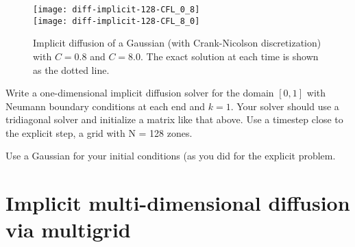 \begin{figure}[t]
\centering
\texttt{[image: diff-implicit-128-CFL\_0\_8]}\\
\texttt{[image: diff-implicit-128-CFL\_8\_0]}
\caption[Implicit diffusion of a Gaussian]{\label{fig:diffuse}
  Implicit diffusion of a Gaussian (with Crank-Nicolson
  discretization) with $C = 0.8$ and $C = 8.0$.  The exact solution at
  each time is shown as the dotted
  line. \\ }
\end{figure}

\begin{exercise}
{Write a one-dimensional implicit diffusion solver for the
  domain $[0,1]$ with Neumann boundary conditions at each end and $k = 1$.
  Your solver should use a tridiagonal solver and initialize a matrix like
  that above.  Use a timestep close to the explicit step, a grid with
  N = 128 zones.

  Use a Gaussian for your initial conditions (as you did for the 
  explicit problem.}
\end{exercise}


\section{Implicit multi-dimensional diffusion via multigrid}
\label{diff:sec:implicit_mg}

